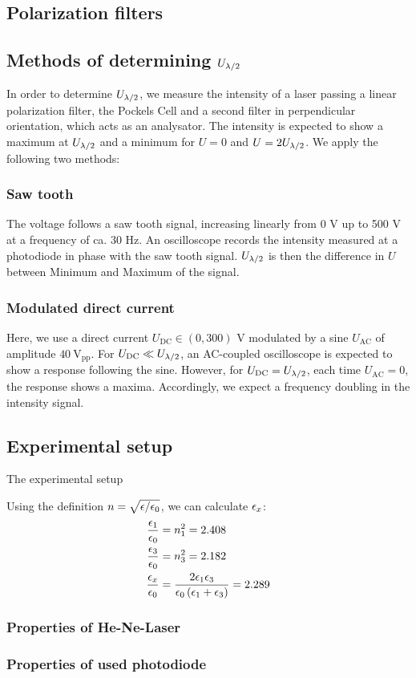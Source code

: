 \subsection{Polarization filters}

\subsection{Methods of determining $U_{\lambda/2}$}
In order to determine $U_{\lambda/2}$, we measure the intensity of a laser 
passing a linear polarization filter, the Pockels Cell and a second filter 
in perpendicular orientation, 
which acts as an analysator. The intensity is expected to show a maximum at 
$U_{\lambda/2}$ and a minimum for $U = 0$ and $U = 2U_{\lambda/2}$. We apply the following two methods:
\subsubsection{Saw tooth}
The voltage follows a saw tooth signal, increasing linearly from 0 V up to 500 V 
at a frequency of ca. 30 Hz. An oscilloscope records the intensity measured 
at a photodiode in phase with the saw tooth signal. $U_{\lambda/2}$ is then the difference 
in $U$ between Minimum and Maximum of the signal. 
\subsubsection{Modulated direct current}
Here, we use a direct current $U_\mathrm{DC} \in (0, 300)$ V modulated by a 
sine $U_\mathrm{AC}$ of amplitude $40 \ \mathrm{V_{pp}}$. 
For $U_\mathrm{DC} \ll U_{\lambda/2}$, an AC-coupled 
oscilloscope is expected to show a response following the sine. However, for 
$U_\mathrm{DC} = U_{\lambda/2}$, each time $U_\mathrm{AC} = 0$, the response shows a maxima. 
Accordingly, we expect a frequency doubling in the intensity signal. 

\subsection{Experimental setup}
The experimental setup



Using the definition $n = \sqrt{\epsilon / \epsilon_0}$, we can calculate $\epsilon_x$:
\begin{align}
    \frac{\epsilon_1}{\epsilon_0} &= n_1^2 = 2.408 \\
    \frac{\epsilon_3}{\epsilon_0} &= n_3^2 = 2.182 \\
    \frac{\epsilon_x}{\epsilon_0} &= \frac{2 \epsilon_1 \epsilon_3}{\epsilon_0 \left( \epsilon_1 + \epsilon_3\right)} = 2.289
\end{align}


\subsubsection{Properties of He-Ne-Laser}
\subsubsection{Properties of used photodiode}
